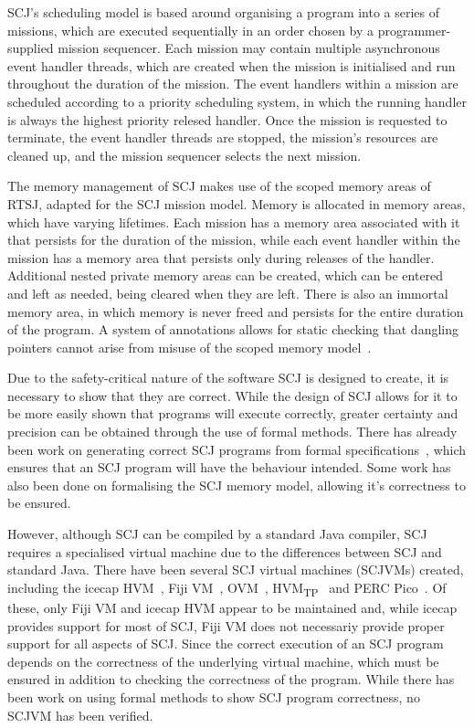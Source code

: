 \documentclass[a4paper,10pt]{report}
\begin{document}
SCJ's scheduling model is based around organising a program into a
series of missions, which are executed sequentially in an order chosen
by a programmer-supplied mission sequencer.
Each mission may contain multiple asynchronous event handler threads,
which are created when the mission is initialised and run throughout
the duration of the mission.
The event handlers within a mission are scheduled according to a
priority scheduling system, in which the running handler is always the
highest priority relesed handler.
Once the mission is requested to terminate, the event handler threads
are stopped, the mission's resources are cleaned up, and the mission
sequencer selects the next mission.

The memory management of SCJ makes use of the scoped memory areas of
RTSJ, adapted for the SCJ mission model.
Memory is allocated in memory areas, which have varying lifetimes.
Each mission has a memory area associated with it that persists for
the duration of the mission, while each event handler within the
mission has a memory area that persists only during releases of the
handler.
Additional nested private memory areas can be created, which can be
entered and left as needed, being cleared when they are left.
There is also an immortal memory area, in which memory is never freed
and persists for the entire duration of the program.
A system of annotations allows for static checking that dangling
pointers cannot arise from misuse of the scoped memory
model~\cite{tang2010}.

Due to the safety-critical nature of the software SCJ is designed to
create, it is necessary to show that they are correct.
While the design of SCJ allows for it to be more easily shown that
programs will execute correctly, greater certainty and precision can
be obtained through the use of formal methods.
There has already been work on generating correct SCJ programs from
formal specifications~\cite{cavalcanti2011, cavalcanti2013}, which
ensures that an SCJ program will have the behaviour intended.
Some work has also been done on formalising the SCJ memory model,
allowing it's correctness to be ensured.

However, although SCJ can be compiled by a standard Java compiler, SCJ
requires a specialised virtual machine due to the differences between
SCJ and standard Java.
There have been several SCJ virtual machines (SCJVMs) created,
including the icecap HVM~\cite{sondergaard2012}, Fiji
VM~\cite{pizlo2009}, OVM~\cite{armbruster2007},
HVM\textsubscript{TP}~\cite{luckow2014} and PERC Pico~\cite{atego2015,
  richard2010}.
Of these, only Fiji VM and icecap HVM appear to be maintained and,
while icecap provides support for most of SCJ, Fiji VM does not
necessariy provide proper support for all aspects of SCJ.
Since the correct execution of an SCJ program depends on the
correctness of the underlying virtual machine, which must be ensured
in addition to checking the correctness of the program.
While there has been work on using formal methods to show SCJ program
correctness, no SCJVM has been verified.
\end{document}

